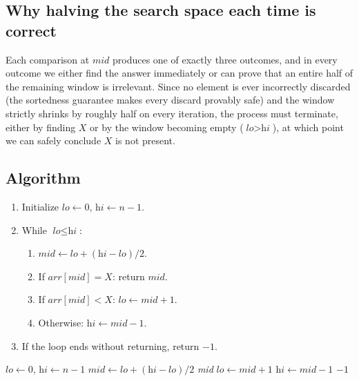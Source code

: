 \subsection*{Why halving the search space each time is correct}

Each comparison at $\textit{mid}$ produces one of exactly three outcomes,
and in every outcome we either find the answer immediately or can prove
that an entire half of the remaining window is irrelevant. Since no element
is ever incorrectly discarded (the sortedness guarantee makes every
discard provably safe) and the window strictly shrinks by roughly half on
every iteration, the process must terminate, either by finding $X$ or by
the window becoming empty ($\textit{lo} > \textit{hi}$), at which point we
can safely conclude $X$ is not present.

\subsection*{Algorithm}

\begin{enumerate}
  \item Initialize $\textit{lo} \gets 0$, $\textit{hi} \gets n-1$.
  \item While $\textit{lo} \le \textit{hi}$:
  \begin{enumerate}
    \item $\textit{mid} \gets \textit{lo} + (\textit{hi}-\textit{lo})/2$.
    \item If $\textit{arr}[\textit{mid}] = X$: return $\textit{mid}$.
    \item If $\textit{arr}[\textit{mid}] < X$: $\textit{lo} \gets
          \textit{mid}+1$.
    \item Otherwise: $\textit{hi} \gets \textit{mid}-1$.
  \end{enumerate}
  \item If the loop ends without returning, return $-1$.
\end{enumerate}

\begin{algorithm}[H]
\caption{Binary Search}
\begin{algorithmic}[1]
  \State $\textit{lo} \gets 0$, $\textit{hi} \gets n-1$
    \State $\textit{mid} \gets \textit{lo} + (\textit{hi}-\textit{lo})/2$
      \State \Return \textit{mid}
      \State $\textit{lo} \gets \textit{mid} + 1$
    \Else
      \State $\textit{hi} \gets \textit{mid} - 1$
    \EndIf
  \EndWhile
  \State \Return $-1$
\EndProcedure
\end{algorithmic}
\end{algorithm}

